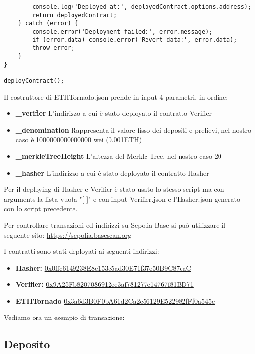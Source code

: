 \begin{lstlisting}
        console.log('Deployed at:', deployedContract.options.address);
        return deployedContract;
    } catch (error) {
        console.error('Deployment failed:', error.message);
        if (error.data) console.error('Revert data:', error.data);
        throw error;
    }
}

deployContract();
\end{lstlisting}

Il costruttore di ETHTornado.json prende in input 4 parametri, in ordine:

\begin{itemize}
    \item \textbf{\_verifier} L'indirizzo a cui è stato deployato il contratto Verifier
    \item \textbf{\_denomination} Rappresenta il valore fisso dei depositi e prelievi, nel nostro caso è 1000000000000000 wei (0.001ETH)
    \item \textbf{\_merkleTreeHeight} L'altezza del Merkle Tree, nel nostro caso 20
    \item \textbf{\_hasher} L'indirizzo a cui è stato deployato il contratto Hasher
\end{itemize}

Per il deploying di Hasher e Verifier è stato usato lo stesso script ma con arguments la lista vuota "[ ]" e con input Verifier.json e l'Hasher.json generato con lo script precedente.

Per controllare transazioni ed indirizzi su Sepolia Base si può utilizzare il seguente sito: \url{https://sepolia.basescan.org}\cite{basescan}

I contratti sono stati deployati ai seguenti indirizzi:

\begin{itemize}
    \item \textbf{Hasher:} \href{https://sepolia.basescan.org/address/0x0ffc6149238E8c153e5ad30E71f37e50B9C87caC}{0x0ffc6149238E8c153e5ad30E71f37e50B9C87caC}
    \item \textbf{Verifier:} \href{https://sepolia.basescan.org/address/0x9A25Fb8207086912ee3af781277e14767f81BD71}{0x9A25Fb8207086912ee3af781277e14767f81BD71}
    \item \textbf{ETHTornado} \href{https://sepolia.basescan.org/address/0x3a6d3B0F0bA61d2Ca2e56129E522982fFf0a545e}{0x3a6d3B0F0bA61d2Ca2e56129E522982fFf0a545e}
\end{itemize}

Vediamo ora un esempio di transazione:

\subsection{Deposito}

